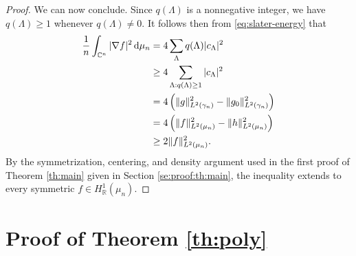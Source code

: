 \documentclass[11pt,reqno]{amsart}
\numberwithin{equation}{section}%
\numberwithin{figure}{section}%
\numberwithin{table}{section}
\theoremstyle{plain}
\theoremstyle{definition}
\begin{document}
\begin{proof}
  We can now conclude. Since $q(\Lambda)$ is a nonnegative integer, we have
  $q(\Lambda)\geq1$ whenever $q(\Lambda)\neq0$. It follows then from
  \eqref{eq:slater-energy} that
  \begin{align}
    \frac{1}{n}
    \int_{\mathbb{C}^n}|\nabla f|^2\,\mathrm{d}\mu_n
    &=
    4\sum_\Lambda q(\Lambda)|c_\Lambda|^2
    \notag\\
    &\geq
    4\sum_{\Lambda:q(\Lambda)\geq1}|c_\Lambda|^2
    \notag\\
    &=
    4\left(
      \|g\|_{L^2(\gamma_n)}^2
      -
      \|g_0\|_{L^2(\gamma_n)}^2
    \right)
    \notag\\
    &=
    4\left(
      \|f\|_{L^2(\mu_n)}^2
      -
      \|h\|_{L^2(\mu_n)}^2
    \right)
    \notag\\
    &\geq
    2\|f\|_{L^2(\mu_n)}^2.\nonumber
  \end{align}
  By the symmetrization, centering, and density argument used in the first
  proof of Theorem \ref{th:main} given in Section \ref{se:proof:th:main}, the
  inequality extends to every symmetric $f\in H^1_{\mathbb{R}}(\mu_n)$.
\end{proof}

\section{Proof of Theorem \ref{th:poly}}
\label{se:proof:th:poly}
\end{document}
